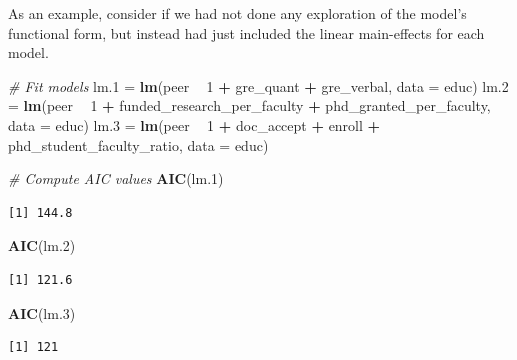 \documentclass[]{book}
\newenvironment{Shaded}{\begin{snugshade}}{\end{snugshade}}
\newcommand{\CommentTok}[1]{\textcolor[rgb]{0.56,0.35,0.01}{\textit{#1}}}
\newcommand{\DataTypeTok}[1]{\textcolor[rgb]{0.13,0.29,0.53}{#1}}
\newcommand{\DecValTok}[1]{\textcolor[rgb]{0.00,0.00,0.81}{#1}}
\newcommand{\FloatTok}[1]{\textcolor[rgb]{0.00,0.00,0.81}{#1}}
\newcommand{\KeywordTok}[1]{\textcolor[rgb]{0.13,0.29,0.53}{\textbf{#1}}}
\newcommand{\NormalTok}[1]{#1}
\newcommand{\OperatorTok}[1]{\textcolor[rgb]{0.81,0.36,0.00}{\textbf{#1}}}
\newcommand{\StringTok}[1]{\textcolor[rgb]{0.31,0.60,0.02}{#1}}
\begin{document}
As an example, consider if we had not done any exploration of the model's functional form, but instead had just included the linear main-effects for each model.

\begin{Shaded}
\begin{Highlighting}[]
\CommentTok{# Fit models}
\NormalTok{lm}\FloatTok{.1}\NormalTok{ =}\StringTok{ }\KeywordTok{lm}\NormalTok{(peer }\OperatorTok{~}\StringTok{ }\DecValTok{1} \OperatorTok{+}\StringTok{ }\NormalTok{gre_quant }\OperatorTok{+}\StringTok{ }\NormalTok{gre_verbal, }\DataTypeTok{data =}\NormalTok{ educ)}
\NormalTok{lm}\FloatTok{.2}\NormalTok{ =}\StringTok{ }\KeywordTok{lm}\NormalTok{(peer }\OperatorTok{~}\StringTok{ }\DecValTok{1} \OperatorTok{+}\StringTok{ }\NormalTok{funded_research_per_faculty }\OperatorTok{+}\StringTok{ }\NormalTok{phd_granted_per_faculty, }\DataTypeTok{data =}\NormalTok{ educ)}
\NormalTok{lm}\FloatTok{.3}\NormalTok{ =}\StringTok{ }\KeywordTok{lm}\NormalTok{(peer }\OperatorTok{~}\StringTok{ }\DecValTok{1} \OperatorTok{+}\StringTok{ }\NormalTok{doc_accept }\OperatorTok{+}\StringTok{ }\NormalTok{enroll }\OperatorTok{+}\StringTok{ }\NormalTok{phd_student_faculty_ratio, }\DataTypeTok{data =}\NormalTok{ educ)}

\CommentTok{# Compute AIC values}
\KeywordTok{AIC}\NormalTok{(lm}\FloatTok{.1}\NormalTok{)}
\end{Highlighting}
\end{Shaded}

\begin{verbatim}
[1] 144.8
\end{verbatim}

\begin{Shaded}
\begin{Highlighting}[]
\KeywordTok{AIC}\NormalTok{(lm}\FloatTok{.2}\NormalTok{)}
\end{Highlighting}
\end{Shaded}

\begin{verbatim}
[1] 121.6
\end{verbatim}

\begin{Shaded}
\begin{Highlighting}[]
\KeywordTok{AIC}\NormalTok{(lm}\FloatTok{.3}\NormalTok{)}
\end{Highlighting}
\end{Shaded}

\begin{verbatim}
[1] 121
\end{verbatim}
\end{document}
